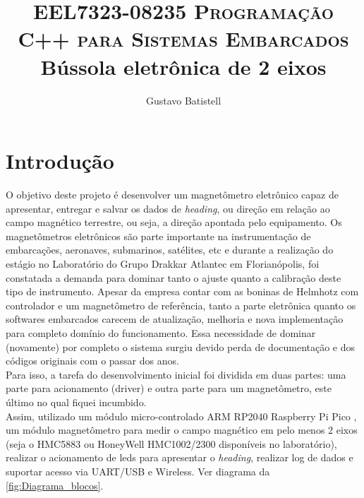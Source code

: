 \documentclass[10pt,twocolumn,letterpaper]{article}
\title{
		\usefont{OT1}{bch}{b}{n}
		\normalfont \normalsize \textsc{EEL7323-08235 Programação C++ para Sistemas Embarcados} \\ [10pt]
		\huge Bússola eletrônica de 2 eixos \\
}
\author[1]{Gustavo Batistell}
\affil[1]{UFSC - Universidade Federal de Santa Catarina \\
\newline Curso de Graduação em Engenharia Eletrônica}
\begin{document}
\maketitle

\section{Introdução}

O objetivo deste projeto é desenvolver um magnetômetro eletrônico capaz de apresentar, entregar e salvar os dados de \emph{heading}, 
ou direção em relação ao campo magnético terrestre, ou seja, a direção apontada pelo equipamento.
Os magnetômetros eletrônicos são parte importante na instrumentação de embarcações, aeronaves, submarinos, satélites, etc e durante 
a realização do estágio no Laboratório do Grupo Drakkar Atlantec em Florianópolis, foi constatada a demanda para dominar tanto o 
ajuste quanto a calibração deste tipo de instrumento. Apesar da empresa contar com as boninas de Helmhotz com controlador e um 
magnetômetro  de referência, tanto a parte eletrônica quanto os softwares embarcados carecem de atualização, melhoria e nova 
implementação para completo domínio do funcionamento. Essa necessidade de dominar (novamente) por completo o sistema surgiu devido 
perda de documentação e dos códigos originais com o passar dos anos. \\
Para isso, a tarefa do desenvolvimento inicial foi dividida em duas partes: uma parte para acionamento (driver) e outra parte para 
um magnetômetro, este último no qual fiquei incumbido.\\
Assim, utilizado um módulo micro-controlado ARM RP2040 Raspberry Pi Pico \cite{RP2040_Datasheet}, um módulo magnetômetro para medir 
o campo magnético em pelo menos 2 eixos (seja o HMC5883 ou HoneyWell HMC1002/2300 disponíveis no laboratório), realizar o acionamento 
de leds para apresentar o \emph{heading}, realizar log de dados e suportar acesso via UART/USB e Wireless. Ver diagrama da 
\autoref{fig:Diagrama_blocos}.
\end{document}
